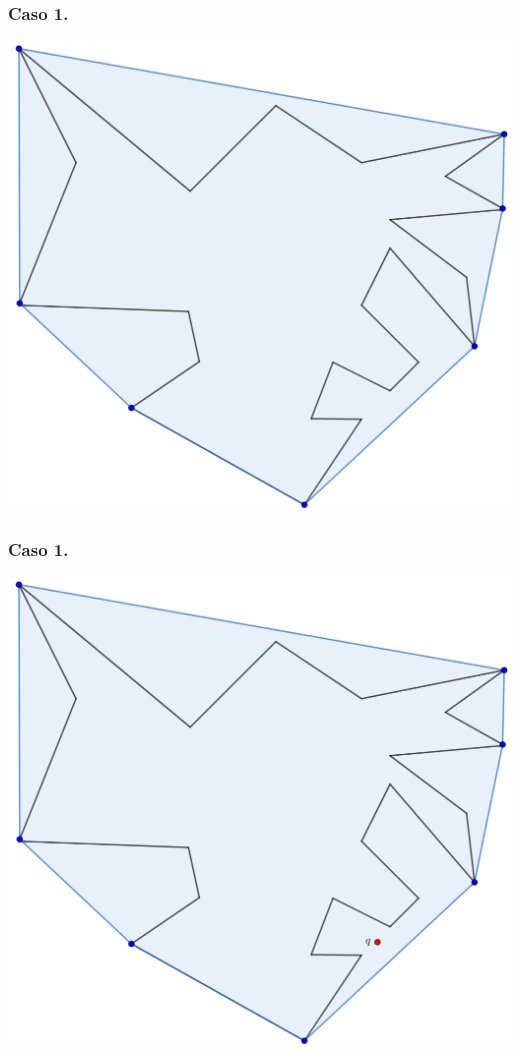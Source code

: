 \begin{frame}
  \frametitle{Caso 1.}
  \centering \includegraphics[width=0.50 \paperwidth]{images/CasosQExterno/P01.png}
\end{frame}

\begin{frame}
  \frametitle{Caso 1.}
  \centering \includegraphics[width=0.50 \paperwidth]{images/CasosQExterno/P02.png}
\end{frame}

